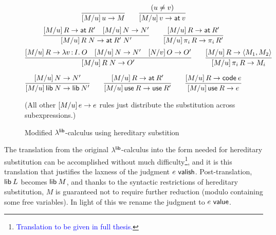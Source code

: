 \documentclass[11pt]{article}
\newcommand{\bscolor}{blue}
\newcommand{\bs}[1]{\textcolor{\bscolor}{#1}}
\begin{document}
\begin{figure}[p]
\begin{description}
      \[
      \infer{\sub{M}{u}{u} \to M}{} \qquad
      \infer{\sub{M}{u}{v} \to \at{v}}{(u \ne v)}
      \]\[
      \infer{\sub{M}{u}{R \ap N} \to \at{R' \ap N'}}{
        \sub{M}{u}{R} \to \at{R'} &
        \sub{M}{u}{N} \to N'}
      \qquad
      \infer{\sub{M}{u}{\proj{i}{R}} \to \proj{i}{R'}}{
        \sub{M}{u}{R} \to \at{R'}
      }
      \]\[
      \infer{\sub{M}{u}{R \ap N} \to O'}{
        \sub{M}{u}{R} \to \lam{v}{I}{O} &
        \sub{M}{u}{N} \to N' &
        \sub{N}{v}{O} \to O'}
      \qquad
      \infer{\sub{M}{u}{\proj{i}{R}} \to M_i}{
          \sub{M}{u}{R} \to \<M_1, M_2\>}
      \]

      \[
      \infer{\sub{M}{u}{\lib{N}} \to \lib{N'}}{
        \sub{M}{u}{N} \to N'}
      \qquad
      \infer{\sub{M}{u}{\use{R}} \to \use{R'}}{
        \sub{M}{u}{R} \to \at{R'}}
      \qquad
      \infer{\sub{M}{u}{\use{R}} \to e}{\sub{M}{u}{R} \to \code{e}}
      \]

      (All other $[{{M}/{u}}]\,{e} \to e$ rules just distribute the substitution
      across subexpressions.)


  \end{description}

  \caption{Modified $\lambda^{\textsf{lib}}$-calculus using hereditary substition}
  \label{fig:hsubst}
\end{figure}

The translation from the original $\lambda^{\textsf{lib}}$-calculus into the form needed for
hereditary substitution can be accomplished without much
difficulty\footnote{\bs{Translation to be given in full thesis.}}, and it is
this translation that justifies the laxness of the judgment $e ~\textsf{valish}$.
Post-translation, $\textsf{lib}\:{L}$ becomes $\textsf{lib}\:{M}$, and thanks to the syntactic
restrictions of hereditary substitution, $M$ is guaranteed not to require
further reduction (modulo containing some free variables). In light of this we
rename the judgment to $e ~\textsf{value}$.
\end{document}
